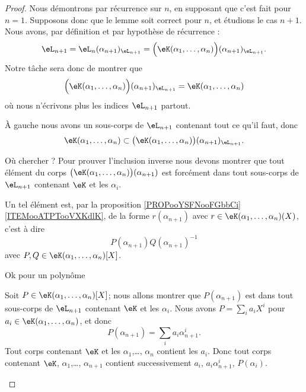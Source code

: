 \begin{proof}
    Nous démontrons par récurrence sur \( n\), en supposant que c'est fait pour \( n=1\). Supposons donc que le lemme soit correct pour \( n\), et étudions le cas \( n+1\). Nous avons, par définition et par hypothèse de récurrence :
    \begin{equation}
        \eL_{n+1}=\eL_n(\alpha_{n+1})_{\eL_{n+1}}=\Big( \eK(\alpha_1,\ldots, \alpha_n) \Big)(\alpha_{n+1})_{\eL_{n+1}}.
    \end{equation}
    Notre tâche sera donc de montrer que
    \begin{equation}
        \Big( \eK(\alpha_1,\ldots, \alpha_n) \Big)(\alpha_{n+1})_{\eL_{n+1}}=\eK(\alpha_1,\ldots,\alpha_n)
    \end{equation}
    où nous n'écrivons plus les indices \( \eL_{n+1}\) partout.

    À gauche nous avons un sous-corps de \( \eL_{n+1}\) contenant tout ce qu'il faut, donc
    \begin{equation}
        \eK(\alpha_1,\ldots,\alpha_n)\subset \big( \eK(\alpha_1,\ldots, \alpha_n) \big)(\alpha_{n+1})_{\eL_{n+1}}.
    \end{equation}
    
    \begin{subproof}
        \item[Où chercher ?]
            Pour prouver l'inclusion inverse nous devons montrer que tout élément du corps \( \big( \eK(\alpha_1,\ldots, \alpha_n) \big)(\alpha_{n+1})\) est forcément dans tout sous-corps de \( \eL_{n+1}\) contenant \( \eK\) et les \( \alpha_i\).

            Un tel élément est, par la proposition \ref{PROPooYSFNooFGbbCi}\ref{ITEMooATPTooVXKdlK}, de la forme \( r(\alpha_{n+1})\) avec \( r\in \eK(\alpha_1,\ldots, \alpha_{n})(X)\), c'est à dire
            \begin{equation}
                P(\alpha_{n+1})Q(\alpha_{n+1})^{-1}
            \end{equation}
            avec \( P,Q\in \eK(\alpha_1,\ldots, \alpha_n)[X]\).

        \item[Ok pour un polynôme]

            Soit \( P\in \eK(\alpha_1,\ldots, \alpha_n)[X]\); nous allons montrer que \( P(\alpha_{n+1})\) est dans tout sous-corps de \( \eL_{n+1}\) contenant \( \eK\) et les \( \alpha_i\). Nous avons \( P=\sum_ia_iX^i\) pour \( a_i\in \eK(\alpha_1,\ldots, \alpha_n)\), et donc
            \begin{equation}
                P(\alpha_{n+1})=\sum_ia_i\alpha_{n+1}^i.
            \end{equation}
            Tout corps contenant \( \eK\) et les \( \alpha_1\),\ldots, \( \alpha_n\) contient les \( a_i\). Donc tout corps contenant \( \eK\), \( \alpha_1\),\ldots,  \( \alpha_{n+1}\) contient successivement \( a_i\), \( a_i\alpha_{n+1}^i\), \( P(\alpha_i)\).


\end{subproof}
\end{proof}

